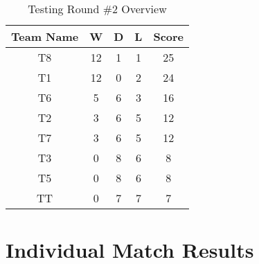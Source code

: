 \documentclass[a4paper,12pt]{article}
\begin{document}
\begin{table}[H]
  \centering
  \caption{Testing Round \#2 Overview}
  \begin{tabular}{|c|c|c|c|c|}
    \hline
      \textbf{Team Name} & \textbf{W} & \textbf{D} & \textbf{L} & \textbf{Score} \\
      \hline
      \hline
       
        
            T8 & 12 & 1 & 1 & 25 \\
            \hline  
            
               
        
            T1 & 12 & 0 & 2 & 24 \\
            \hline  
            
               
        
            T6 & 5 & 6 & 3 & 16 \\
            \hline  
            
               
        
            T2 & 3 & 6 & 5 & 12 \\
            \hline  
            
               
        
            T7 & 3 & 6 & 5 & 12 \\
            \hline  
            
               
        
            T3 & 0 & 8 & 6 & 8 \\
            \hline  
            
               
        
            T5 & 0 & 8 & 6 & 8 \\
            \hline  
            
               
         
          TT & 0 & 7 & 7 & 7 \\
          \hline  
          
              
                
              \end{tabular}
              \label{table:overview}
          \end{table}

          \section{Individual Match Results}
          \label{sec:all}
\end{document}

